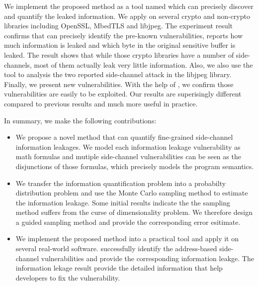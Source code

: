 We implement the proposed method as a tool named \tool{} which can precisely discover and quantify the leaked information. 
We apply \tool{} on several crypto and non-crypto libraries including OpenSSL,
MbedTLS and libjpeg. The experiment result confirms that \tool{} can precisely identify the pre-known vulnerabilities,
reports how much information is leaked and which byte in the original sensitive buffer is leaked. 
The result shows that while those crypto libraries have a number of side-channels, most of them actually
leak very little information. Also, we also use the tool to analysis the two reported side-channel attack 
in the libjpeg library. Finally, we present new vulnerabilities. With the help of \tool{}, we confirm those
vulnerabilities are easily to be exploited. Our results are superisingly different compared to previous results
and much more useful in practice.

In summary, we make the following contributions:

\begin{itemize}
	\item We propose a novel method that can quantify fine-grained side-channel
        information leakages. We model each information leakage vulnerability as math formulas and 
        mutiple side-channel vulnerabilities can be seen as the disjunctions of those formulas, which
        precisely models the program semantics.
        \item We transfer the information quantification problem into a probabilty distribution problem and 
        use the Monte Carlo sampling method to estimate the information leakage. Some initial results indicate the 
        the sampling method suffers from the curse of dimensionality problem. We therefore design a guided
        sampling method and provide the corresponding error esitimate.
	\item We implement the proposed method into a practical tool and apply it on several real-world software. \tool{} 
        successfully identify the address-based side-channel vulnerabilities and provide the corresponding
        information leakge. The information lekage result provide the detailed information that help developers
        to fix the vulnerability.
\end{itemize}



